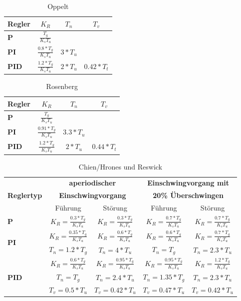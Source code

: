\begin{table}[h]
\centering
\renewcommand*{\arraystretch}{1.7}
\begin{tabular}{|l|c|c|c|}
\hline 
\textbf{Regler} & \textbf{$K_R$} & \textbf{$T_n$} & \textbf{$T_v$} \\ 
\hline 
\textbf{P} & $\frac{T_g}{K_sT_u}$ &  &  \\ 
\hline 
\textbf{PI} & $\frac{0.8*T_g}{K_sT_u}$ & $3*T_u$ &  \\ 
\hline 
\textbf{PID} & $\frac{1.2*T_g}{K_sT_u}$ & $2*T_u$ & $0.42*T_t$ \\ 
\hline 
\end{tabular} 
\renewcommand*{\arraystretch}{1}
\caption{Oppelt}
\end{table}

\begin{table}[h]
\centering
\renewcommand*{\arraystretch}{1.7}
\begin{tabular}{|l|c|c|c|}
\hline 
\textbf{Regler} & \textbf{$K_R$} & \textbf{$T_n$} & \textbf{$T_v$} \\ 
\hline 
\textbf{P} & $\frac{T_g}{K_sT_u}$ &  &  \\ 
\hline 
\textbf{PI} & $\frac{0.91*T_g}{K_sT_u}$ & $3.3*T_u$ &  \\ 
\hline 
\textbf{PID} & $\frac{1.2*T_g}{K_sT_u}$ & $2*T_u$ & $0.44*T_t$ \\ 
\hline 
\end{tabular} 
\renewcommand*{\arraystretch}{1}
\caption{Rosenberg}
\end{table}

\begin{table}
\centering
\renewcommand*{\arraystretch}{1.5}
\begin{tabular}{|l|c|c|c|c|}
\hline 
& \multicolumn{2}{c|}{\textbf{aperiodischer}} & \multicolumn{2}{c|}{\textbf{Einschwingvorgang mit}} \\
\textbf{Reglertyp} & \multicolumn{2}{c|}{\textbf{Einschwingvorgang}} & \multicolumn{2}{c|}{\textbf{20\% Überschwingen}}\\
\cline{2-5} 
 & Führung & Störung & Führung & Störung \\ 
\hline 
\textbf{P} & $K_R=\frac{0.3*T_g}{K_sT_u}$ & $K_R=\frac{0.3*T_g}{K_sT_u}$ & $K_R=\frac{0.7*T_g}{K_sT_u}$ & $K_R=\frac{0.7*T_g}{K_sT_u}$ \\ 
\hline 
\multirow{2}{*}{\textbf{PI}} & $K_R=\frac{0.35*T_g}{K_sT_u}$ & $K_R=\frac{0.6*T_g}{K_sT_u}$ & $K_R=\frac{0.6*T_g}{K_sT_u}$ & $K_R=\frac{0.7*T_g}{K_sT_u}$ \\ 
& $T_n=1.2*T_g$ & $T_n=4*T_u$ & $T_n=T_g$ & $T_n=2.3*T_u$ \\ 
\hline 
 & $K_R=\frac{0.6*T_g}{K_sT_u}$ & $K_R=\frac{0.95*T_g}{K_sT_u}$ & $K_R=\frac{0.95*T_g}{K_sT_u}$ & $K_R=\frac{1.2*T_g}{K_sT_u}$\\ 
\textbf{PID} & $T_n=T_g$ & $T_n=2.4*T_u$ &  $T_n=1.35*T_g$ & $T_n=2.3*T_u$ \\ 
 & $T_v=0.5*T_u$ & $T_v=0.42*T_u$ & $T_v=0.47*T_u$ & $T_v=0.42*T_u$ \\ 
\hline 
\end{tabular}
\renewcommand*{\arraystretch}{1}
\caption{Chien/Hrones und Reswick} 
\end{table}


